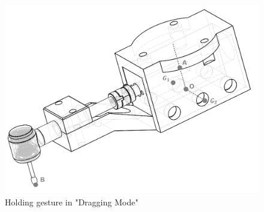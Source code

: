 \begin{figure}[htbp]
\begin{center}
\includegraphics[width=0.8\linewidth]{Images/holding_gesture.png}
\caption{
Holding gesture in "Dragging Mode"
}\label{fig:holding gesture}
\end{center}
\end{figure}